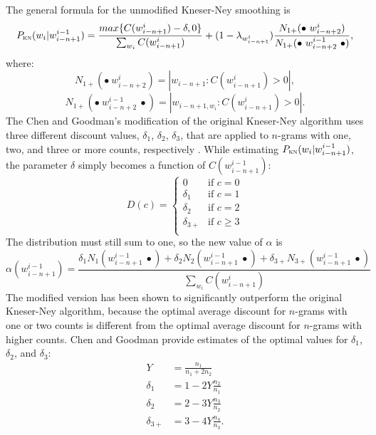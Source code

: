 	The general formula for the unmodified Kneser-Ney smoothing is
	\begin{equation}
		P_{\textsc{kn}}(w_{i}|w_{i-n+1}^{i-1})= \frac{max\{C(w_{i-n+1}^{i})-\delta, 0\}}{\sum_{w_{i}}C(w_{i-n+1}^{i})}+(1-\lambda_{w_{i-n+1}^{i}})\frac{N_{1+}(\bullet~w_{i-n+2}^{i})}{N_{1+}(\bullet~w_{i-n+2}^{i-1}~\bullet)},
	\end{equation}
	where:
	\begin{equation}
		N_{1+}(\bullet~w_{i-n+2}^{i})=|{w_{i-n+1}:C(w_{i-n+1}^{i})>0}|,
	\end{equation}
	\begin{equation}
		N_{1+}(\bullet~w_{i-n+2}^{i-1}~\bullet)=|{w_{i-n+1, w_{i}}:C(w_{i-n+1}^{i})>0}|.
	\end{equation}
	The Chen and Goodman's modification of the original Kneser-Ney algorithm uses three different discount values, $\delta_{1}$, $\delta_{2}$, $\delta_{3}$, that are applied to \mbox{$n$-gram}s with one, two, and three or more counts, respectively \cite{chen1996empirical}. While estimating $P_{\textsc{kn}}(w_{i}|w_{i-n+1}^{i-1})$, the parameter $\delta$ simply becomes a function of $C(w_{i-n+1}^{i-1})$: 
	\begin{equation}
		D(c)=	
		\begin{cases}
			0 & \text{if } c=0\\
			\delta_{1} & \text{if } c=1\\
			\delta_{2} & \text{if } c=2\\
			\delta_{3+} & \text{if } c\geq3\\
		\end{cases}
	\end{equation}
	The distribution must still sum to one, so the new value of $\alpha$ is
	\begin{equation}
		\alpha(w_{i-n+1}^{i-1})=\frac{\delta_{1}N_{1}(w_{i-n+1}^{i-1}~\bullet)+\delta_{2}N_{2}(w_{i-n+1}^{i-1}~\bullet)+\delta_{3+}N_{3+}(w_{i-n+1}^{i-1}~\bullet)}{\sum_{w_{i}}C(w_{i-n+1}^{i})}
	\end{equation}
	The modified version has been shown to significantly outperform the original Kneser-Ney algorithm, because the optimal average discount for \mbox{$n$-gram}s with one or two counts is different from the optimal average discount for \mbox{$n$-gram}s with higher counts. Chen and Goodman provide estimates of the optimal values for $\delta_{1}$, $\delta_{2}$, and $\delta_{3}$:
	\begin{align}
		Y&=\frac{n_{1}}{n_{1}+2n_{2}} \nonumber\\ 
		\delta_{1}&=1-2Y\frac{n_{2}}{n_{1}} \nonumber\\
		\delta_{2}&=2-3Y\frac{n_{3}}{n_{2}} \nonumber\\
		\delta_{3+}&=3-4Y\frac{n_{4}}{n_{3}}.
	\end{align}
